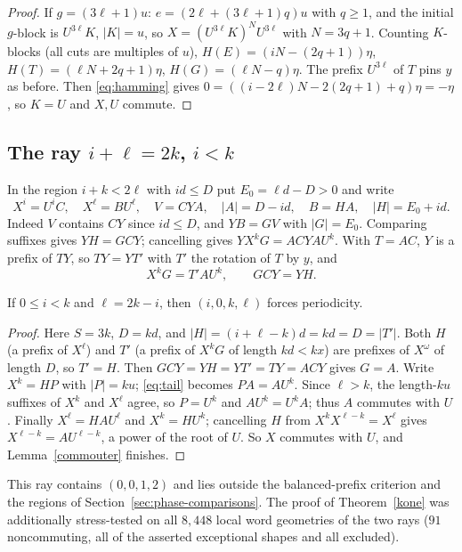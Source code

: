 \begin{proof}
If \(g=(3\ell+1)u\): \(e=(2\ell+(3\ell+1)q)u\) with \(q\ge1\), and the initial \(g\)-block is \(U^{3\ell}K\), \(|K|=u\), so \(X=(U^{3\ell}K)^{N}U^{3\ell}\) with \(N=3q+1\). Counting \(K\)-blocks (all cuts are multiples of \(u\)), \(H(E)=(iN-(2q+1))\eta\), \(H(T)=(\ell N+2q+1)\eta\), \(H(G)=(\ell N-q)\eta\). The prefix \(U^{3\ell}\) of \(T\) pins \(y\) as before. Then \eqref{eq:hamming} gives \(0=((i-2\ell)N-2(2q+1)+q)\eta=-\eta\), so \(K=U\) and \(X,U\) commute.
\end{proof}

\subsection{The ray \(i+\ell=2k\), \(i<k\)}
In the region \(i+k<2\ell\) with \(id\le D\) put \(E_0=\ell d-D>0\) and write
\[
X^i=U^iC,\quad X^\ell=BU^\ell,\quad V=CYA,\quad |A|=D-id,\quad B=HA,\quad |H|=E_0+id.
\]
Indeed \(V\) contains \(CY\) since \(id\le D\), and \(YB=GV\) with \(|G|=E_0\). Comparing suffixes gives \(YH=GCY\); cancelling gives \(YX^kG=ACYAU^k\). With \(T=AC\), \(Y\) is a prefix of \(TY\), so \(TY=YT'\) with \(T'\) the rotation of \(T\) by \(y\), and
\begin{equation}\label{eq:tail}
X^kG=T'AU^k,\qquad GCY=YH.
\end{equation}

\begin{theorem}\label{rightray}
If \(0\le i<k\) and \(\ell=2k-i\), then \((i,0,k,\ell)\) forces periodicity.
\end{theorem}
\begin{proof}
Here \(S=3k\), \(D=kd\), and \(|H|=(i+\ell-k)d=kd=D=|T'|\). Both \(H\) (a prefix of \(X^\ell\)) and \(T'\) (a prefix of \(X^kG\) of length \(kd<kx\)) are prefixes of \(X^\omega\) of length \(D\), so \(T'=H\). Then \(GCY=YH=YT'=TY=ACY\) gives \(G=A\). Write \(X^k=HP\) with \(|P|=ku\); \eqref{eq:tail} becomes \(PA=AU^k\). Since \(\ell>k\), the length-\(ku\) suffixes of \(X^k\) and \(X^\ell\) agree, so \(P=U^k\) and \(AU^k=U^kA\); thus \(A\) commutes with \(U\). Finally \(X^\ell=HAU^\ell\) and \(X^k=HU^k\); cancelling \(H\) from \(X^kX^{\ell-k}=X^\ell\) gives \(X^{\ell-k}=AU^{\ell-k}\), a power of the root of \(U\). So \(X\) commutes with \(U\), and Lemma~\ref{commouter} finishes.
\end{proof}

\begin{remark}
This ray contains \((0,0,1,2)\) and lies outside the balanced-prefix criterion and the regions of Section~\ref{sec:phase-comparisons}. The proof of Theorem~\ref{kone} was additionally stress-tested on all \(8{,}448\) local word geometries of the two rays (\(91\) noncommuting, all of the asserted exceptional shapes and all excluded).
\end{remark}
